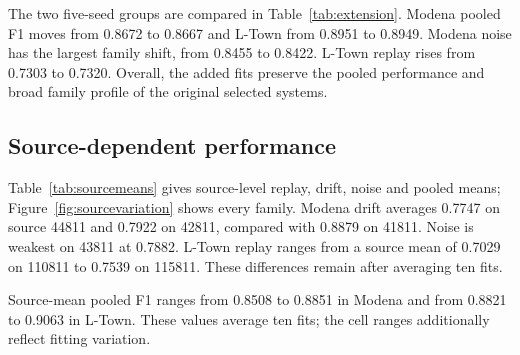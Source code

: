 The two five-seed groups are compared in Table~\ref{tab:extension}. Modena pooled F1 moves from 0.8672 to 0.8667 and L-Town from 0.8951 to 0.8949. Modena noise has the largest family shift, from 0.8455 to 0.8422. L-Town replay rises from 0.7303 to 0.7320. Overall, the added fits preserve the pooled performance and broad family profile of the original selected systems.



\subsection{Source-dependent performance}
\label{sec:sourceperformance}
Table~\ref{tab:sourcemeans} gives source-level replay, drift, noise and pooled means; Figure~\ref{fig:sourcevariation} shows every family. Modena drift averages 0.7747 on source 44811 and 0.7922 on 42811, compared with 0.8879 on 41811. Noise is weakest on 43811 at 0.7882. L-Town replay ranges from a source mean of 0.7029 on 110811 to 0.7539 on 115811. These differences remain after averaging ten fits.

\begingroup
\let\originaltable\table
\renewcommand{\table}[1][]{\originaltable[!htbp]}

\endgroup
{}

Source-mean pooled F1 ranges from 0.8508 to 0.8851 in Modena and from 0.8821 to 0.9063 in L-Town. These values average ten fits; the cell ranges additionally reflect fitting variation.



\endgroup
